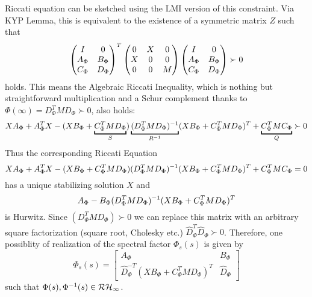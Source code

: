 Riccati equation can be sketched using the LMI version of this constraint. Via KYP Lemma, this is equivalent to the existence 
of a symmetric matrix $Z$ such that 
\begin{equation}
\begin{pmatrix}I &0\\A_{\Phi} &B_{\Phi}\\C_{\Phi}&D_{\Phi}\end{pmatrix}^T
\begin{pmatrix}0 &X &0\\X &0 &0\\0 &0 &M\end{pmatrix}
\begin{pmatrix}I &0\\A_{\Phi} &B_{\Phi}\\C_{\Phi}&D_{\Phi}\end{pmatrix} \succ 0
\label{eq:specfactLMI}
\end{equation}
holds. This means the Algebraic Riccati Inequality, which is nothing but straightforward multiplication and a Schur complement
thanks to $\Phi(\infty)=D^T_\Phi M D_\Phi\succ 0$, also holds:
\begin{equation}
XA_{\Phi} + A^T_{\Phi}X - (XB_{\Phi}+\underbracket{C_{\Phi}^TMD_\Phi}_S)\underbracket{\inv{(D^T_{\Phi}MD_{\Phi})}}_{\inv{R}}
(XB_{\Phi}+C_{\Phi}^TMD_\Phi)^T+\underbracket{C^T_{\Phi}MC_{\Phi}}_Q \succ 0
\label{eq:specfactARI}
\end{equation}
Thus the corresponding Riccati Equation 
\begin{equation}
XA_{\Phi} + A^T_{\Phi}X - (XB_{\Phi}+C_{\Phi}^TMD_\Phi)(D^T_{\Phi}MD_{\Phi})^{-1}
(XB_{\Phi}+C_{\Phi}^TMD_\Phi)^T+C^T_{\Phi}MC_{\Phi} = 0
\label{eq:specfactARI}
\end{equation}
has a unique stabilizing solution $X$ and 
\[
A_\Phi - B_\Phi(D^T_{\Phi}MD_{\Phi})^{-1}(XB_{\Phi}+C_{\Phi}^TMD_\Phi)^T
\]
is Hurwitz. Since $(D^T_{\Phi}MD_{\Phi})\succ 0$ we can replace this matrix with an arbitrary square factorization (square root,
Cholesky etc.) $\hat{D}_\Phi^T\hat{D}_\Phi\succ 0$. Therefore, one possiblity of realization of the spectral factor $\Phi_s(s)$ is given by
\[
\Phi_s(s) = \left[
\begin{array}{c|c}
	A_\Phi &B_\Phi\\\hline
	\hat{D}_\Phi^{-T}(XB_{\Phi}+C_{\Phi}^TMD_\Phi)^T&\hat{D}_\Phi
\end{array}
\right]
\]
such that $\Phi(s),\Phi^{-1}(s)\in\mathcal{RH}_\infty$.













